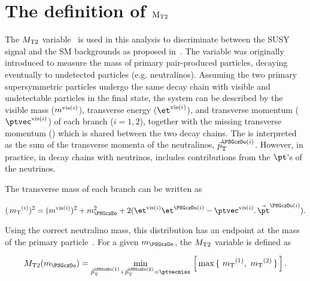 \section{\texorpdfstring{The definition of $\rm {\ensuremath{{M_{\rm T2}}}}$}{The definition of MT2}}
\label{sect:mt2def}
The ${M_{\rm T2}}$ variable~\cite{Lester:1999tx,Barr:2003rg} is used in this analysis to discriminate between the SUSY signal and the SM backgrounds as proposed in~\cite{Barr:2009wu}. The variable was originally introduced to measure the mass of primary pair-produced particles, decaying eventually to undetected particles (e.g. neutralinos). Assuming the two primary supersymmetric particles undergo the same decay chain with visible and undetectable particles in the final state, the system can be described by the visible mass ($m^{{\rm vis}(i)}$), transverse energy ($\etvisi$), and transverse momentum ($\vptvisi$) of each branch ($i=1,2$), together with the 
missing transverse momentum (\ptvecmiss) which is shared between the two decay chains. The \ptvecmiss is interpreted as the sum of the transverse momenta
of the neutralinos, $\vec{p}_{\rm T}^{\PSGczDo(i)}$.
However, in practice, in decay chains with neutrinos, \ptvecmiss includes contributions from the $\pt$'s of the neutrinos.

The transverse mass of each branch can be written as 
\begin{linenomath}
\begin{equation}
\label{eq:mtdef}
(\mt^{(i)})^{2}= (\mvisi)^2+m^2_{\PSGczDo}+2(\etvisi\et^{\PSGczDo(i)}-{\vptvisi}.\,{\vec{\pt}^{\PSGczDo(i)}}).
\end{equation}
\end{linenomath}

\noindent Using the correct neutralino mass, this distribution has an endpoint at the mass of the primary particle~\cite{Arnison:1983rp,Banner:1983jy,Affolder:2000bpa,Abazov:2002bu}. 
For a given $m_{\PSGczDo}$, the ${M_{\rm T2}}$ variable is defined as
\begin{linenomath}
\begin{equation}
\label{eq:mt2def}
\mttwo(m_{\PSGczDo})= \min_{\vec{p}_{\rm T}^{\PSGczDo(1)}+\vec{p}_{\rm T}^{\PSGczDo(2)}=\ptvecmiss}\,\left[\,\max\,\{ \, \mt^{(1)},\,\mt^{(2)}\,\}\,\right].
\end{equation}
\end{linenomath}

